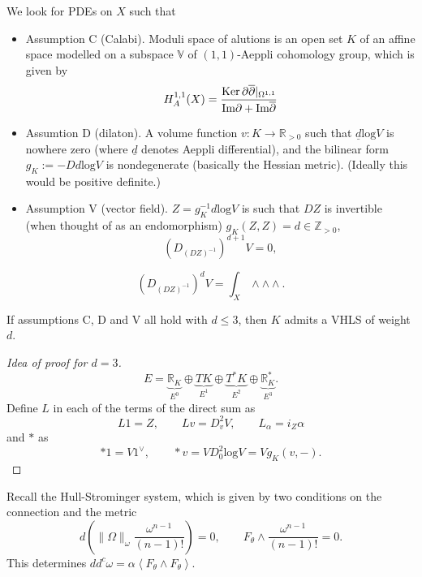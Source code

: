 We look for PDEs on  $X$ such that
\begin{itemize}
\item Assumption C (Calabi). Moduli
space of alutions is an open set $K$
of an affine space modelled on
a subspace $\mathbb{V}$ of
$(1,1)$-Aeppli cohomology group,
which is given by
$$
H^{1,1}_A(X)=\frac{\mathop{\mathrm{Ker}}
\partial\overline{\partial}|_{\Omega^{1,1}}}
{\text{Im}
\partial+\text{Im}\overline{\partial}}
$$

\item Assumtion D (dilaton).
A volume function $v:K\to \mathbb{R}_{>0}$
such that $\underline{d}\text{log} V$
is nowhere zero (where $\underline{d}$
denotes
Aeppli differential), and the bilinear form
$g_K:=-Dd \text{log}V$
is nondegenerate (basically the Hessian
metric).
(Ideally this would be positive definite.)

\item Assumption V (vector field).
$Z=g_K^{-1}d \text{log}V$
is such that $DZ$ is invertible
(when thought of as an endomorphism)
$g_K(Z,Z)=d \in \mathbb{Z}_{>0}$,
 $$
(D_{(DZ)^{-1}})^{d+1}V=0,
$$
\end{itemize}

\begin{remark}
\label{remark-pairing}
$$
(D_{(DZ)^{-1}})^dV=\int_X \wedge \wedge
\wedge.
$$
\end{remark}

\begin{theorem}
\label{theorem-GGA}
If assumptions C, D and V all hold with  $d
\leq 3$,
then $K$ admits a VHLS of weight $d$.
\end{theorem}

\begin{proof}[Idea of proof for $d=3$]
$$
E=\underbrace{\mathbb{R}_K}_{E^0} \oplus
\underbrace{TK}_{E^1}
\oplus \underbrace{T^*K}_{E^2} \oplus
\underbrace{\mathbb{R}_K^*}_{E^3}.
$$
Define $L$ in each of the terms of the direct
sum as
$$
L1=Z,\qquad Lv=D^2_vV,\qquad
L_\alpha=i_Z\alpha
$$
and $*$ as
$$
*1=V 1^\vee,\qquad  *v=VD^2_0
\text{log}V=Vg_K(v,-).
$$
\end{proof}

\medskip\noindent
Recall the Hull-Strominger
system, which is given by two conditions
on the connection and the metric
$$
d\left(\|\Omega\|_\omega
\frac{\omega^{n-1}}{(n-1)!}\right)=0,\qquad
F_\theta \wedge
\frac{\omega^{n-1}}{(n-1)!}=0.
$$
This determines $d
d^c\omega=\alpha\left\langle{}F_\theta \wedge
F_\theta\right\rangle{}$.



